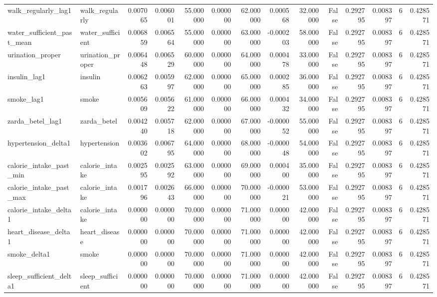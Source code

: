\begin{longtable}{llrrrrrrrrrrrr}
walk\_regularly\_lag1 & walk\_regularly & 0.007065 & 0.006001 & 55.000000 & 0.000000 & 62.000000 & 0.000568 & 32.000000 & False & 0.292795 & 0.008397 & 6 & 0.428571 \\
water\_sufficient\_past\_mean & water\_sufficient & 0.006859 & 0.006564 & 55.000000 & 0.000000 & 63.000000 & -0.000203 & 58.000000 & False & 0.292795 & 0.008397 & 6 & 0.428571 \\
urination\_proper & urination\_proper & 0.006448 & 0.006529 & 60.000000 & 0.000000 & 64.000000 & 0.000478 & 33.000000 & False & 0.292795 & 0.008397 & 6 & 0.428571 \\
insulin\_lag1 & insulin & 0.006263 & 0.005997 & 62.000000 & 0.000000 & 65.000000 & 0.000285 & 36.000000 & False & 0.292795 & 0.008397 & 6 & 0.428571 \\
smoke\_lag1 & smoke & 0.005609 & 0.005622 & 61.000000 & 0.000000 & 66.000000 & 0.000432 & 34.000000 & False & 0.292795 & 0.008397 & 6 & 0.428571 \\
zarda\_betel\_lag1 & zarda\_betel & 0.004240 & 0.005718 & 62.000000 & 0.000000 & 67.000000 & -0.000052 & 55.000000 & False & 0.292795 & 0.008397 & 6 & 0.428571 \\
hypertension\_delta1 & hypertension & 0.003602 & 0.006795 & 64.000000 & 0.000000 & 68.000000 & -0.000048 & 54.000000 & False & 0.292795 & 0.008397 & 6 & 0.428571 \\
calorie\_intake\_past\_min & calorie\_intake & 0.002595 & 0.002592 & 63.000000 & 0.000000 & 69.000000 & 0.000400 & 35.000000 & False & 0.292795 & 0.008397 & 6 & 0.428571 \\
calorie\_intake\_past\_max & calorie\_intake & 0.001796 & 0.002643 & 66.000000 & 0.000000 & 70.000000 & -0.000021 & 53.000000 & False & 0.292795 & 0.008397 & 6 & 0.428571 \\
calorie\_intake\_delta1 & calorie\_intake & 0.000000 & 0.000000 & 70.000000 & 0.000000 & 71.000000 & 0.000000 & 42.000000 & False & 0.292795 & 0.008397 & 6 & 0.428571 \\
heart\_disease\_delta1 & heart\_disease & 0.000000 & 0.000000 & 70.000000 & 0.000000 & 71.000000 & 0.000000 & 42.000000 & False & 0.292795 & 0.008397 & 6 & 0.428571 \\
smoke\_delta1 & smoke & 0.000000 & 0.000000 & 70.000000 & 0.000000 & 71.000000 & 0.000000 & 42.000000 & False & 0.292795 & 0.008397 & 6 & 0.428571 \\
sleep\_sufficient\_delta1 & sleep\_sufficient & 0.000000 & 0.000000 & 70.000000 & 0.000000 & 71.000000 & 0.000000 & 42.000000 & False & 0.292795 & 0.008397 & 6 & 0.428571 \\

\end{longtable}
